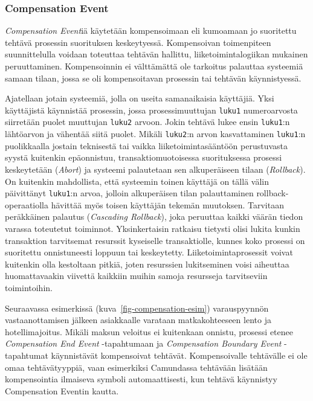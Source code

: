 \documentclass[
  finnish,
  letterpaper,
  DIV=11,
  numbers=noendperiod,
  oneside]{scrreprt}
\begin{document}
\subsubsection{Compensation Event}\label{compensation-event}

\emph{Compensation Event}iä käytetään kompensoimaan eli kumoamaan jo
suoritettu tehtävä prosessin suorituksen keskeytyessä. Kompensoivan
toimenpiteen suunnittelulla voidaan toteuttaa tehtävän hallittu,
liiketoimintalogiikan mukainen peruuttaminen. Kompensoinnin ei
välttämättä ole tarkoitus palauttaa systeemiä samaan tilaan, jossa se
oli kompensoitavan prosessin tai tehtävän käynnistyessä.

Ajatellaan jotain systeemiä, jolla on useita samanaikaisia käyttäjiä.
Yksi käyttäjistä käynnistää prosessin, jossa prosessimuuttujan
\texttt{luku1} numeroarvosta siirretään puolet muuttujan \texttt{luku2}
arvoon. Jokin tehtävä lukee ensin \texttt{luku1}:n lähtöarvon ja
vähentää siitä puolet. Mikäli \texttt{luku2}:n arvon kasvattaminen
\texttt{luku1}:n puolikkaalla jostain teknisestä tai vaikka
liiketoimintasääntöön perustuvasta syystä kuitenkin epäonnistuu,
transaktiomuotoisessa suorituksessa prosessi keskeytetään (\emph{Abort})
ja systeemi palautetaan sen alkuperäiseen tilaan (\emph{Rollback}). On
kuitenkin mahdollista, että systeemin toinen käyttäjä on tällä välin
päivittänyt \texttt{luku1}:n arvoa, jolloin alkuperäisen tilan
palauttaminen rollback-operaatiolla hävittää myös toisen käyttäjän
tekemän muutoksen. Tarvitaan peräkkäinen palautus (\emph{Cascading
Rollback}), joka peruuttaa kaikki väärän tiedon varassa toteutetut
toiminnot. Yksinkertaisin ratkaisu tietysti olisi lukita kunkin
transaktion tarvitsemat resurssit kyseiselle transaktiolle, kunnes koko
prosessi on suoritettu onnistuneesti loppuun tai keskeytetty.
Liiketoimintaprosessit voivat kuitenkin olla kestoltaan pitkiä, joten
resurssien lukitseminen voisi aiheuttaa huomattavaakin viivettä kaikkiin
muihin samoja resursseja tarvitseviin toimintoihin.

Seuraavassa esimerkissä (kuva~\ref{fig-compensation-esim}) varauspyynnön
vastaanottamisen jälkeen asiakkaalle varataan matkakohteeseen lento ja
hotellimajoitus. Mikäli maksun veloitus ei kuitenkaan onnistu, prosessi
etenee \emph{Compensation End Event} -tapahtumaan ja \emph{Compensation
Boundary Event} -tapahtumat käynnistävät kompensoivat tehtävät.
Kompensoivalle tehtävälle ei ole omaa tehtävätyyppiä, vaan esimerkiksi
Camundassa tehtävään lisätään kompensointia ilmaiseva symboli
automaattisesti, kun tehtävä käynnistyy Compensation Eventin kautta.
\end{document}
